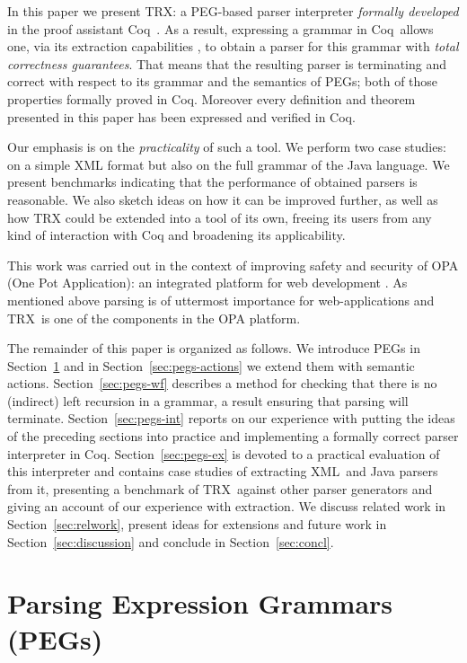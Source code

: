 \documentclass{LMCS}
\newcommand{\coq}{Coq}
\newcommand{\xml}{XML}
\newcommand{\TRX}{TRX}
\theoremstyle{definition}
\begin{document}
In this paper we present \TRX: a PEG-based parser interpreter \emph{formally developed} in the
proof assistant \coq\ \cite{Coq,BerCas04}. As a result, expressing a grammar in \coq\
allows one, via its extraction capabilities \cite{Let08}, to obtain a parser for this grammar
with \emph{total correctness guarantees}. That means that the resulting parser is terminating 
and correct with respect to its grammar and the semantics of PEGs; both of those 
properties formally proved in \coq. Moreover every definition and theorem presented in 
this paper has been expressed and verified in \coq.

Our emphasis is on the \emph{practicality} of such a tool. We perform two case studies: on a simple
XML format but also on the full grammar of the Java language. We present benchmarks indicating
that the performance of obtained parsers is reasonable. We also sketch ideas on how it can be
improved further, as well as how TRX could be extended into a tool of its own, freeing its 
users from any kind of interaction with Coq and broadening its applicability.

This work was carried out in the context of improving safety and security of OPA (One Pot Application):
an integrated platform for web development \cite{OPA}. As mentioned above parsing is of
uttermost importance for web-applications and \TRX\ is one of the components in the 
OPA platform.

The remainder of this paper is organized as follows. We introduce PEGs in Section~\ref{sec:pegs} 
and in Section~\ref{sec:pegs-actions} we extend them with semantic actions.
Section~\ref{sec:pegs-wf} describes a method for checking that there is no (indirect)
left recursion in a grammar, a result ensuring that parsing will terminate.
Section~\ref{sec:pegs-int} reports on our experience with putting the ideas of the preceding
sections into practice and implementing a formally correct parser interpreter in \coq.
Section~\ref{sec:pegs-ex} is devoted to a practical evaluation of this interpreter and contains 
case studies of extracting \xml\ and Java parsers from it, presenting a benchmark of
\TRX\ against other parser generators and giving an account of our experience with 
extraction. We discuss related work in Section~\ref{sec:relwork}, present ideas for
extensions and future work in Section~\ref{sec:discussion} and conclude in Section~\ref{sec:concl}.

 \section{Parsing Expression Grammars (PEGs)}\label{sec:pegs}
\end{document}
